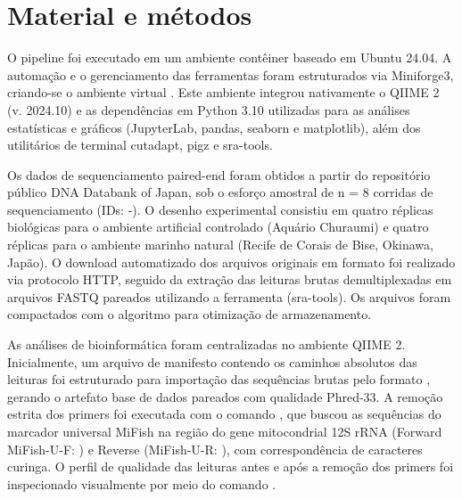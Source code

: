 \section{Material e métodos}
\label{section:method}

O pipeline foi executado em um ambiente contêiner baseado em Ubuntu 24.04. A automação e o gerenciamento das ferramentas foram estruturados via Miniforge3, criando-se o ambiente virtual . Este ambiente integrou nativamente o QIIME 2 (v. 2024.10) e as dependências em Python 3.10 utilizadas para as análises estatísticas e gráficos (JupyterLab, pandas, seaborn e matplotlib), além dos utilitários de terminal cutadapt, pigz e sra-tools.

Os dados de sequenciamento paired-end foram obtidos a partir do repositório público DNA Databank of Japan, sob o esforço amostral de n = 8 corridas de sequenciamento (IDs: -). O desenho experimental consistiu em quatro réplicas biológicas para o ambiente artificial controlado (Aquário Churaumi) e quatro réplicas para o ambiente marinho natural (Recife de Corais de Bise, Okinawa, Japão). O download automatizado dos arquivos originais em formato  foi realizado via protocolo HTTP, seguido da extração das leituras brutas demultiplexadas em arquivos FASTQ pareados utilizando a ferramenta  (sra-tools). Os arquivos foram compactados com o algoritmo  para otimização de armazenamento.

As análises de bioinformática foram centralizadas no ambiente QIIME 2. Inicialmente, um arquivo de manifesto contendo os caminhos absolutos das leituras foi estruturado para importação das sequências brutas pelo formato , gerando o artefato base de dados pareados com qualidade Phred-33. A remoção estrita dos primers foi executada com o comando , que buscou as sequências do marcador universal MiFish na região do gene mitocondrial 12S rRNA (Forward MiFish-U-F: ) e Reverse (MiFish-U-R: ), com correspondência de caracteres curinga. O perfil de qualidade das leituras antes e após a remoção dos primers foi inspecionado visualmente por meio do comando .

